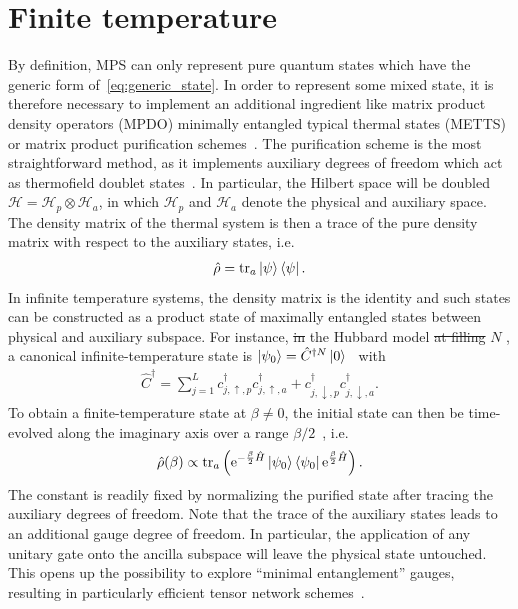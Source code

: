 \documentclass{svmono}
\def\re{\mathrm e}
\def\tr{{\rm tr}}
\def\HS{\mathcal{H}}
\newcommand{\brlr}[1]{\left( #1 \right)}
\providecommand{\DIFaddtex}[1]{{\protect\color{blue}\uwave{#1}}} %
\providecommand{\DIFdeltex}[1]{{\protect\color{red}\sout{#1}}}                      %
\providecommand{\DIFaddbegin}{} %
\providecommand{\DIFaddend}{} %
\providecommand{\DIFdelbegin}{} %
\providecommand{\DIFdelend}{} %
\providecommand{\DIFadd}[1]{\texorpdfstring{\DIFaddtex{#1}}{#1}} %
\providecommand{\DIFdel}[1]{\texorpdfstring{\DIFdeltex{#1}}{}} %
\newcommand{\DIFscaledelfig}{0.5}
\newlength{\DIFdelgraphicswidth} %
\newlength{\DIFdelgraphicsheight} %
\newcommand{\DIFaddincludegraphics}[2][]{{\color{blue}\fbox{\DIFOincludegraphics[#1]{#2}}}} %
\newcommand{\DIFdelincludegraphics}[2][]{%
\sbox{\DIFdelgraphicsbox}{\DIFOincludegraphics[#1]{#2}}%
\settoboxwidth{\DIFdelgraphicswidth}{\DIFdelgraphicsbox} %
\settoboxtotalheight{\DIFdelgraphicsheight}{\DIFdelgraphicsbox} %
\scalebox{\DIFscaledelfig}{%
\parbox[b]{\DIFdelgraphicswidth}{\usebox{\DIFdelgraphicsbox}\\[-\baselineskip] \rule{\DIFdelgraphicswidth}{0em}}\llap{\resizebox{\DIFdelgraphicswidth}{\DIFdelgraphicsheight}{%
\setlength{\unitlength}{\DIFdelgraphicswidth}%
\begin{picture}(1,1)%
\thicklines\linethickness{2pt} %
{\color[rgb]{1,0,0}\put(0,0){\framebox(1,1){}}}%
{\color[rgb]{1,0,0}\put(0,0){\line( 1,1){1}}}%
{\color[rgb]{1,0,0}\put(0,1){\line(1,-1){1}}}%
\end{picture}%
}\hspace*{3pt}}} %
} %
\DeclareRobustCommand{\DIFaddbegin}{\DIFOaddbegin \let\includegraphics\DIFaddincludegraphics} %
\DeclareRobustCommand{\DIFaddend}{\DIFOaddend \let\includegraphics\DIFOincludegraphics} %
\DeclareRobustCommand{\DIFdelbegin}{\DIFOdelbegin \let\includegraphics\DIFdelincludegraphics} %
\DeclareRobustCommand{\DIFdelend}{\DIFOaddend \let\includegraphics\DIFOincludegraphics} %
\begin{document}
\section{Finite temperature}
\label{sec:finite_temperature}
By definition, MPS can only represent pure quantum states which have the generic form of~\cref{eq:generic_state}.
In order to represent some mixed state, it is therefore necessary to implement an additional ingredient like matrix product density operators (MPDO) minimally entangled typical thermal states (METTS) or matrix product purification schemes~\cite{Binder2015}.
The purification scheme is the most straightforward method, as it implements auxiliary degrees of freedom which act as thermofield doublet states~\cite{Barnett1987}.
In particular, the Hilbert space will be doubled $\HS = \HS_p\otimes\HS_a$, in which $\HS_p$ and $\HS_a$ denote the physical and auxiliary space.
The density matrix of the thermal system is then a trace of the pure density matrix with respect to the auxiliary states, i.e.
\begin{align}
    \hat\rho = \tr_a\ket\psi\bra\psi.
\end{align}
In infinite temperature systems, the density matrix is the identity and such states can be constructed as a product state of maximally entangled states between physical and auxiliary subspace.
For instance, \DIFdelbegin \DIFdel{in }\DIFdelend \DIFaddbegin \DIFadd{for }\DIFaddend the Hubbard model \DIFdelbegin \DIFdel{at filling }\DIFdelend \DIFaddbegin \DIFadd{with }\DIFaddend $N$ \DIFaddbegin \DIFadd{particles}\DIFaddend , a canonical infinite-temperature state is $\ket{\psi_0}=\hat C^{\dag N}\ket0$~\cite{Barthel2016} with
\begin{align}
    \hat C^\dag = \sum_{j=1}^L c^\dag_{j,\uparrow,p}c^\dag_{j,\uparrow,a} + c^\dag_{j,\downarrow,p}c^\dag_{j,\downarrow,a}.
\end{align}
To obtain a finite-temperature state at $\beta\neq0$, the initial state can then be time-evolved along the imaginary axis over a range $\beta/2$~\cite{Barnett1987}, i.e.
\begin{align}
    \hat\rho(\beta) \propto \tr_a\brlr{\re^{-\frac\beta2\hat H}\ket{\psi_0}\bra{\psi_0}\re^{\frac\beta2\hat H}}.
\end{align}
The constant is readily fixed by normalizing the purified state after tracing the auxiliary degrees of freedom.
Note that the trace of the auxiliary states leads to an additional gauge degree of freedom.
In particular, the application of any unitary gate onto the ancilla subspace will leave the physical state untouched.
This opens up the possibility to explore ``minimal entanglement'' gauges, resulting in particularly efficient tensor network schemes~\cite{Barthel2013,Hauschild2018,Wolff2020}.
\end{document}
